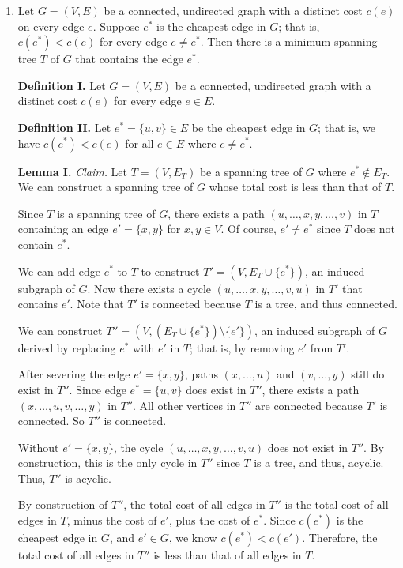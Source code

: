 \begin{enumerate}
\item Let $G = (V, E)$ be a connected, undirected graph with a distinct cost $c(e)$ on every edge $e$. Suppose $e^*$ is the cheapest edge in $G$; that is, $c(e^*) < c(e)$ for every edge $e \neq e^*$. Then there is a minimum spanning tree $T$ of $G$ that contains the edge $e^*$.
\begin{solution}

\textbf{Definition I. }Let $G=(V,E)$ be a connected, undirected graph with a distinct cost $c(e)$ for every edge $e\in E$.

\textbf{Definition II. }Let $e^*=\{u,v\}\in E$ be the cheapest edge in $G$; that is, we have $c(e^*)<c(e)$ for all $e\in E$ where $e\neq e^*$.

\textbf{Lemma I. }\textit{Claim. }Let $T=(V,E_T)$ be a spanning tree of $G$ where $e^*\notin E_T$. We can construct a spanning tree of $G$ whose total cost is less than that of $T$.

Since $T$ is a spanning tree of $G$, there exists a path $(u,\dots,x,y,\dots,v)$ in $T$ containing an edge $e'=\{x,y\}$ for $x,y\in V$. Of course, $e'\neq e^*$ since $T$ does not contain $e^*$.

We can add edge $e^*$ to $T$ to construct $T'=(V,E_T\cup\{e^*\})$, an induced subgraph of $G$. Now there exists a cycle $(u,\dots,x,y,\dots,v,u)$ in $T'$ that contains $e'$. Note that $T'$ is connected because $T$ is a tree, and thus connected.

We can construct $T''=(V,(E_T\cup\{e^*\})\setminus\{e'\})$, an induced subgraph of $G$ derived by replacing $e^*$ with $e'$ in $T$; that is, by removing $e'$ from $T'$.

After severing the edge $e'=\{x,y\}$, paths $(x,\dots,u)$ and $(v,\dots,y)$ still do exist in $T''$. Since edge $e^*=\{u,v\}$ does exist in $T''$, there exists a path $(x,\dots,u,v,\dots,y)$ in $T''$. All other vertices in $T''$ are connected because $T'$ is connected. So $T''$ is connected. 

Without $e'=\{x,y\}$, the cycle $(u,\dots,x,y,\dots,v,u)$ does not exist in $T''$. By construction, this is the only cycle in $T''$ since $T$ is a tree, and thus, acyclic. Thus, $T''$ is acyclic.

By construction of $T''$, the total cost of all edges in $T''$ is the total cost of all edges in $T$, minus the cost of $e'$, plus the cost of $e^*$. Since $c(e^*)$ is the cheapest edge in $G$, and $e'\in G$, we know $c(e^*)<c(e')$. Therefore, the total cost of all edges in $T''$ is less than that of all edges in $T$.


\end{solution}
\end{enumerate}
